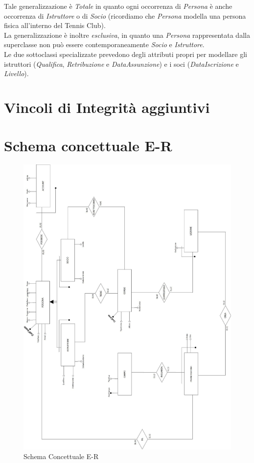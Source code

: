 Tale generalizzazione è \textit{Totale} in quanto ogni occorrenza di \textit{Persona} è anche occorrenza di \textit{Istruttore} o di \textit{Socio} (ricordiamo che \textit{Persona} modella una persona fisica all'interno del Tennis Club).\\
La generalizzazione è inoltre \textit{esclusiva}, in quanto una \textit{Persona} rappresentata dalla superclasse non può essere contemporaneamente \textit{Socio} e \textit{Istruttore}.\\

Le due sottoclassi specializzate prevedono degli attributi propri per modellare gli istruttori (\textit{Qualifica}, \textit{Retribuzione} e \textit{DataAssunzione}) e i soci (\textit{DataIscrizione} e \textit{Livello}).

\section{Vincoli di Integrità aggiuntivi}
\section{Schema concettuale E-R}
\begin{figure}[H]
 \centering
  \includegraphics[width=\textwidth, height=\textheight]{Images/ER_FINALE.jpg}
\caption{Schema Concettuale E-R}
\end{figure}
